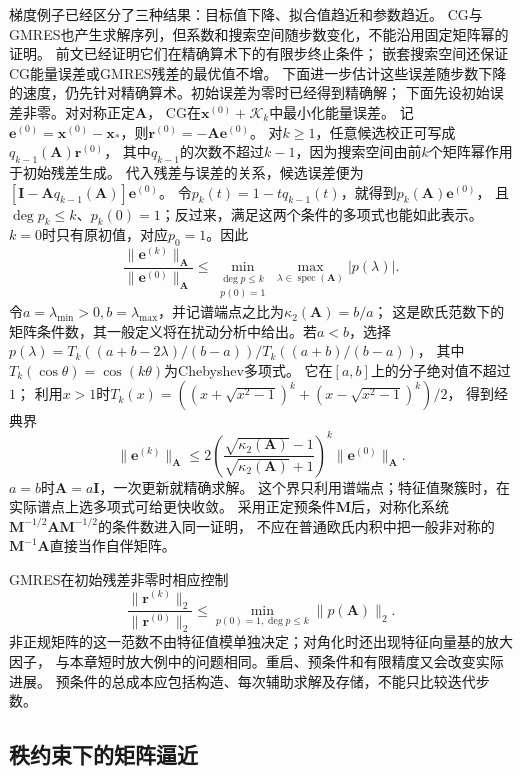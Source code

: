 梯度例子已经区分了三种结果：目标值下降、拟合值趋近和参数趋近。
CG与GMRES也产生求解序列，但系数和搜索空间随步数变化，不能沿用固定矩阵幂的证明。
前文已经证明它们在精确算术下的有限步终止条件；
嵌套搜索空间还保证CG能量误差或GMRES残差的最优值不增。
下面进一步估计这些误差随步数下降的速度，仍先针对精确算术。初始误差为零时已经得到精确解；
下面先设初始误差非零。对对称正定$\bm A$，
CG在$\bm x^{(0)}+\mathcal K_k$中最小化能量误差。
记$\bm e^{(0)}=\bm x^{(0)}-\bm x_*$，则$\bm r^{(0)}=-\bm A\bm e^{(0)}$。
对$k\geq1$，任意候选校正可写成$q_{k-1}(\bm A)\bm r^{(0)}$，
其中$q_{k-1}$的次数不超过$k-1$，因为搜索空间由前$k$个矩阵幂作用于初始残差生成。
代入残差与误差的关系，候选误差便为
$[\bm I-\bm A q_{k-1}(\bm A)]\bm e^{(0)}$。
令$p_k(t)=1-tq_{k-1}(t)$，就得到$p_k(\bm A)\bm e^{(0)}$，
且$\deg p_k\leq k$、$p_k(0)=1$；反过来，满足这两个条件的多项式也能如此表示。
$k=0$时只有原初值，对应$p_0=1$。因此
\[
 \frac{\lVert\bm e^{(k)}\rVert_{\bm A}}{\lVert\bm e^{(0)}\rVert_{\bm A}}
 \leq\min_{\substack{\deg p\leq k\\p(0)=1}}
        \max_{\lambda\in\operatorname{spec}(\bm A)}|p(\lambda)|.
\]
令$a=\lambda_{\min}>0,b=\lambda_{\max}$，并记谱端点之比为$\kappa_2(\bm A)=b/a$；
这是欧氏范数下的矩阵条件数，其一般定义将在扰动分析中给出。若$a<b$，选择
$p(\lambda)=T_k((a+b-2\lambda)/(b-a))/T_k((a+b)/(b-a))$，
其中$T_k(\cos\theta)=\cos(k\theta)$为Chebyshev多项式。
它在$[a,b]$上的分子绝对值不超过$1$；
利用$x>1$时$T_k(x)=((x+\sqrt{x^2-1})^k+(x-\sqrt{x^2-1})^k)/2$，
得到经典界
\begin{equation}
 \lVert\bm e^{(k)}\rVert_{\bm A}
 \leq2\left(\frac{\sqrt{\kappa_2(\bm A)}-1}
                 {\sqrt{\kappa_2(\bm A)}+1}\right)^k
       \lVert\bm e^{(0)}\rVert_{\bm A}.
 \label{eq:ch06-cg-condition-bound}
\end{equation}
$a=b$时$\bm A=a\bm I$，一次更新就精确求解。
这个界只利用谱端点；特征值聚簇时，在实际谱点上选多项式可给更快收敛。
采用正定预条件$\bm M$后，对称化系统
$\bm M^{-1/2}\bm A\bm M^{-1/2}$的条件数进入同一证明，
不应在普通欧氏内积中把一般非对称的$\bm M^{-1}\bm A$直接当作自伴矩阵。

GMRES在初始残差非零时相应控制
\[
\frac{\lVert\bm r^{(k)}\rVert_2}{\lVert\bm r^{(0)}\rVert_2}
\leq\min_{p(0)=1,\deg p\leq k}\lVert p(\bm A)\rVert_2.
\]
非正规矩阵的这一范数不由特征值模单独决定；对角化时还出现特征向量基的放大因子，
与本章短时放大例中的问题相同。重启、预条件和有限精度又会改变实际进展。
预条件的总成本应包括构造、每次辅助求解及存储，不能只比较迭代步数。

\subsection{秩约束下的矩阵逼近}
\label{sec:matrix-analysis-svd-low-rank}
\label{sec:ch06-rank-constrained-approximation}
\label{sec:ch06-error-constrained-rank}

